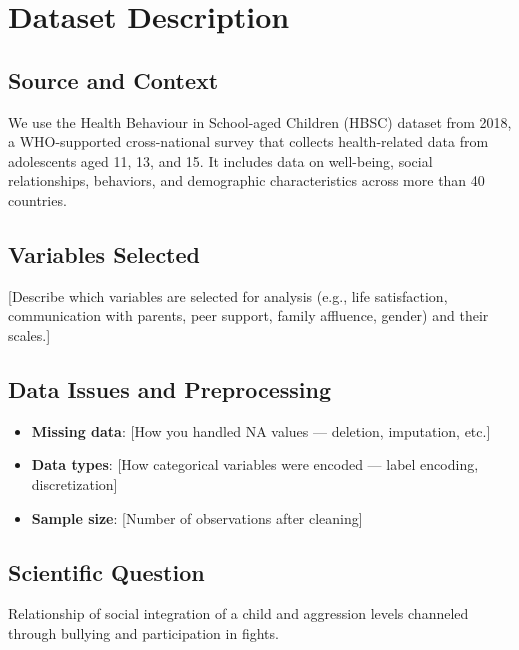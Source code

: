 \documentclass[a4paper]{article}
\begin{document}
\section{Dataset Description}
\label{sec:dataset}

\subsection{Source and Context}
We use the Health Behaviour in School-aged Children (HBSC) dataset from 2018, a WHO-supported cross-national survey that collects health-related data from adolescents aged 11, 13, and 15. It includes data on well-being, social relationships, behaviors, and demographic characteristics across more than 40 countries.

\subsection{Variables Selected}
[Describe which variables are selected for analysis (e.g., life satisfaction, communication with parents, peer support, family affluence, gender) and their scales.]

\subsection{Data Issues and Preprocessing}
\begin{itemize}
    \item \textbf{Missing data}: [How you handled NA values — deletion, imputation, etc.]
    \item \textbf{Data types}: [How categorical variables were encoded — label encoding, discretization]
    \item \textbf{Sample size}: [Number of observations after cleaning]
\end{itemize}

\subsection{Scientific Question}
Relationship of social integration of a child and aggression levels channeled through bullying and participation in fights.  
\end{document}
